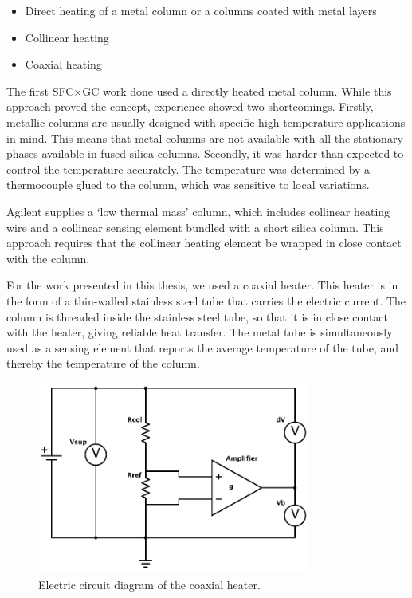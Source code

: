 \begin{itemize}
  \item Direct heating of a metal column or a columns coated with metal layers
  \item Collinear heating
  \item Coaxial heating
\end{itemize}

The first SFC×GC work done \autocite{Venter2004} used a directly heated metal
column. While this approach proved the concept, experience showed two
shortcomings. Firstly, metallic columns are usually designed with specific
high-temperature applications in mind. This means that metal columns are not
available with all the stationary phases available in fused-silica columns.
Secondly, it was harder than expected to control the temperature accurately. The
temperature was determined by a thermocouple glued to the column, which was
sensitive to local variations.

Agilent\texttrademark{} supplies a `low thermal mass' column, which includes
collinear heating wire and a collinear sensing element bundled with a short
silica column. This approach requires that the collinear heating element be
wrapped in close contact with the column.

For the work presented in this thesis, we used a coaxial heater. This heater is
in the form of a thin-walled stainless steel tube that carries the electric
current. The column is threaded inside the stainless steel tube, so that it is
in close contact with the heater, giving reliable heat transfer. The metal tube
is simultaneously used as a sensing element that reports the average temperature
of the tube, and thereby the temperature of the column.

\begin{figure}[htbp]
	\centering
	\includegraphics[width=0.8\textwidth]{Figures/Column-Heater.pdf}
	\decoRule
	\caption[Coaxial heater resistance heater]{\label{fig:HeaterDiagram}Electric circuit diagram of the coaxial heater.}
\end{figure}

